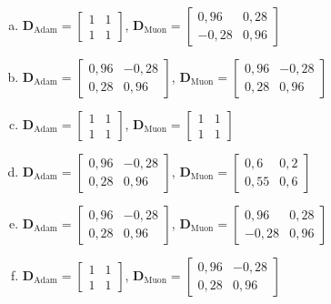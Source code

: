 \documentclass{dlproblemset}
\begin{document}
\begin{enumerate}[1)]
    \begin{enumerate}[(a)]
        \item $\mathbf{D}_{\text{Adam}} = \begin{bmatrix} 1 & 1 \\ 1 & 1 \end{bmatrix}$, \quad $\mathbf{D}_{\text{Muon}} = \begin{bmatrix} 0{,}96 & 0{,}28 \\ -0{,}28 & 0{,}96 \end{bmatrix}$
        \item $\mathbf{D}_{\text{Adam}} = \begin{bmatrix} 0{,}96 & -0{,}28 \\ 0{,}28 & 0{,}96 \end{bmatrix}$, \quad $\mathbf{D}_{\text{Muon}} = \begin{bmatrix} 0{,}96 & -0{,}28 \\ 0{,}28 & 0{,}96 \end{bmatrix}$
        \item $\mathbf{D}_{\text{Adam}} = \begin{bmatrix} 1 & 1 \\ 1 & 1 \end{bmatrix}$, \quad $\mathbf{D}_{\text{Muon}} = \begin{bmatrix} 1 & 1 \\ 1 & 1 \end{bmatrix}$
        \item $\mathbf{D}_{\text{Adam}} = \begin{bmatrix} 0{,}96 & -0{,}28 \\ 0{,}28 & 0{,}96 \end{bmatrix}$, \quad $\mathbf{D}_{\text{Muon}} = \begin{bmatrix} 0{,}6 & 0{,}2 \\ 0{,}55 & 0{,}6 \end{bmatrix}$
        \item $\mathbf{D}_{\text{Adam}} = \begin{bmatrix} 0{,}96 & -0{,}28 \\ 0{,}28 & 0{,}96 \end{bmatrix}$, \quad $\mathbf{D}_{\text{Muon}} = \begin{bmatrix} 0{,}96 & 0{,}28 \\ -0{,}28 & 0{,}96 \end{bmatrix}$
        \item $\mathbf{D}_{\text{Adam}} = \begin{bmatrix} 1 & 1 \\ 1 & 1 \end{bmatrix}$, \quad $\mathbf{D}_{\text{Muon}} = \begin{bmatrix} 0{,}96 & -0{,}28 \\ 0{,}28 & 0{,}96 \end{bmatrix}$

\end{enumerate}
\end{enumerate}
\end{document}

